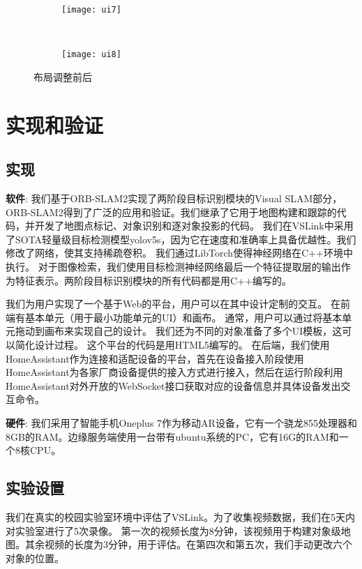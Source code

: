 \begin{figure}[htb]
	\centering
	\begin{subfigure}{.65\linewidth}
		\texttt{[image: ui7]}
		\caption{}
	\end{subfigure}
	\ 
	\begin{subfigure}{.65\linewidth}
		\texttt{[image: ui8]}
		\caption{}
	\end{subfigure}
	\caption{布局调整前后}\label{fig:ui78}
\end{figure}

\chapter{实现和验证}
\label{chap:eval}
\section{实现}
\textbf{软件}: 我们基于ORB-SLAM2\cite{mur2017orb}实现了两阶段目标识别模块的Visual SLAM部分，ORB-SLAM2得到了广泛的应用和验证。我们继承了它用于地图构建和跟踪的代码，并开发了地图点标记、对象识别和逐对象投影的代码。
我们在VSLink中采用了SOTA轻量级目标检测模型yolov5s\cite{glenn_jocher_2020_4154370}，因为它在速度和准确率上具备优越性。我们修改了网络，使其支持稀疏卷积\cite{ren2018sbnet}。
我们通过LibTorch使得神经网络在C++环境中执行。
对于图像检索，我们使用目标检测神经网络最后一个特征提取层的输出\cite{glenn_jocher_2020_4154370}作为特征表示。两阶段目标识别模块的所有代码都是用C++编写的。

我们为用户实现了一个基于Web的平台，用户可以在其中设计定制的交互。
在前端有基本单元（用于最小功能单元的UI）和画布。
通常，用户可以通过将基本单元拖动到画布来实现自己的设计。
我们还为不同的对象准备了多个UI模板，这可以简化设计过程。
这个平台的代码是用HTML5编写的。
在后端，我们使用HomeAssistant\cite{homeass}作为连接和适配设备的平台，首先在设备接入阶段使用HomeAssistant为各家厂商设备提供的接入方式进行接入，然后在运行阶段利用HomeAssistant对外开放的WebSocket接口获取对应的设备信息并具体设备发出交互命令。

\textbf{硬件}: 我们采用了智能手机Oneplus 7作为移动AR设备，它有一个骁龙855处理器和8GB的RAM。边缘服务端使用一台带有ubuntu系统的PC，它有16G的RAM和一个8核CPU。
\section{实验设置}

我们在真实的校园实验室环境中评估了VSLink。为了收集视频数据，我们在5天内对实验室进行了5次录像。
第一次的视频长度为8分钟，该视频用于构建对象级地图。其余视频的长度为3分钟，用于评估。在第四次和第五次，我们手动更改六个对象的位置。

